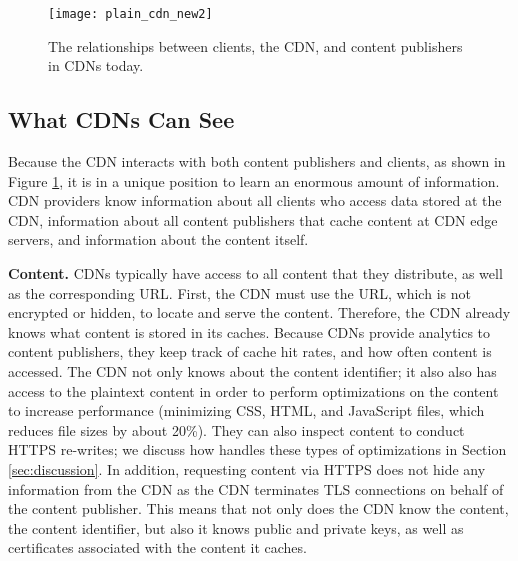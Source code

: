 \begin{figure}[t]
\centering
\texttt{[image: plain\_cdn\_new2]}
\caption{The relationships between clients, the CDN, and content publishers in 
CDNs today.}
\label{fig:basic_cdn}
\end{figure}

\subsection{What CDNs Can See}
\label{sec:info}
Because the CDN interacts with both content publishers and clients, as shown in Figure \ref{fig:basic_cdn}, it is in a unique position 
to learn an enormous amount of information.  CDN providers know information about all clients who
access data stored at the CDN, information about all content publishers that cache content at 
CDN edge servers, and information about the content itself.

\textbf{Content.}  CDNs typically have access to all content that they distribute,
as well as 
the corresponding URL.  First, the CDN must use the URL, which is not 
encrypted or hidden, to locate and serve the content. Therefore, 
the CDN already knows what content is
stored in its caches.  Because CDNs provide analytics to content publishers, they
keep track of cache hit 
rates, and how often content is accessed.  The CDN not only knows
about the content identifier; it also also 
has access to the plaintext content in order to perform optimizations on the content
to increase performance (\eg minimizing CSS, HTML, and JavaScript files, which reduces file sizes by about 20\%).  They can also inspect content to conduct HTTPS re-writes; we discuss how \system{} handles these types of optimizations  
in Section \ref{sec:discussion}. In addition, requesting content via HTTPS does not hide any information 
from the CDN as the CDN terminates TLS connections on behalf of the 
content publisher.  This means that not only does the CDN know the content, the
content identifier, but also it knows 
public and private keys, as well as certificates associated with the content it caches.  


